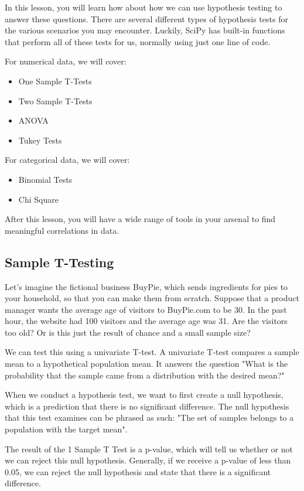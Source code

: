 \documentclass{journal}
\begin{document}
In this lesson, you will learn how about how we can use hypothesis testing to answer these questions. There are several different types of hypothesis tests for the various scenarios you may encounter. Luckily, SciPy has built-in functions that perform all of these tests for us, normally using just one line of code.

For numerical data, we will cover:
\begin{itemize}
    \item One Sample T-Tests
    \item Two Sample T-Tests
    \item ANOVA
    \item Tukey Tests
\end{itemize}


For categorical data, we will cover:
\begin{itemize}
    \item Binomial Tests
    \item Chi Square
\end{itemize}


After this lesson, you will have a wide range of tools in your arsenal to find meaningful correlations in data.

\subsection{Sample T-Testing}
Let's imagine the fictional business BuyPie, which sends ingredients for pies to your household, so that you can make them from scratch. Suppose that a product manager wants the average age of visitors to BuyPie.com to be 30. In the past hour, the website had 100 visitors and the average age was 31. Are the visitors too old? Or is this just the result of chance and a small sample size?

We can test this using a univariate T-test. A univariate T-test compares a sample mean to a hypothetical population mean. It answers the question "What is the probability that the sample came from a distribution with the desired mean?"

When we conduct a hypothesis test, we want to first create a null hypothesis, which is a prediction that there is no significant difference. The null hypothesis that this test examines can be phrased as such: "The set of samples belongs to a population with the target mean".

The result of the 1 Sample T Test is a p-value, which will tell us whether or not we can reject this null hypothesis. Generally, if we receive a p-value of less than 0.05, we can reject the null hypothesis and state that there is a significant difference.
\end{document}
